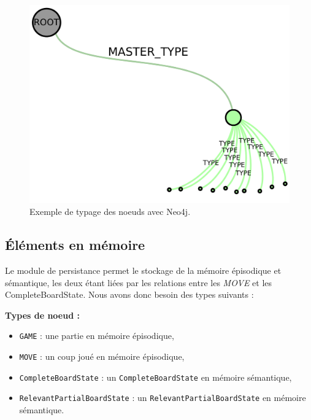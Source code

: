 \begin{figure}[H]
\includegraphics[width=\textwidth]{files/neo4j/example_node_type}
\caption{Exemple de typage des noeuds avec Neo4j.}
\label{example_node_type}
\end{figure}

\subsection{Éléments en mémoire}

Le module de persistance permet le stockage de la mémoire épisodique et sémantique, les deux étant liées par les relations entre les \emph{MOVE} et les \gls{CompleteBoardState}. Nous avons donc besoin des types suivants : 

\textbf{Types de noeud :}
\begin{itemize}
	\item \texttt{GAME} : une partie en mémoire épisodique, 
	\item \texttt{MOVE} : un coup joué en mémoire épisodique,
	\item \texttt{\gls{CompleteBoardState}} : un \texttt{\gls{CompleteBoardState}} en mémoire sémantique,
	\item \texttt{\gls{RelevantPartialBoardState}} : un \texttt{\gls{RelevantPartialBoardState}} en mémoire sémantique.
\end{itemize}


